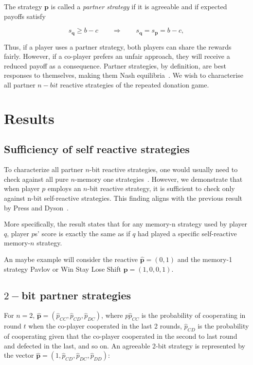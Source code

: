 \documentclass{article}
\theoremstyle{definition}
\begin{document}
The strategy $\mathbf{p}$ is called a {\it partner strategy} if it is agreeable
and if expected payoffs satisfy

\begin{equation} \label{Eq:partner}
    s_{\mathbf{q}} \geq b\!-\!c \qquad \Rightarrow \qquad s_{\mathbf{q}} = s_{\mathbf{p}} =  b\!-\!c,
\end{equation}

Thus, if a player uses a partner strategy, both players can share the rewards
fairly. However, if a co-player prefers an unfair approach, they will receive a
reduced payoff as a consequence. Partner strategies, by definition, are best
responses to themselves, making them Nash equilibria~\cite{Hilbe:GEB:2015}. We
wish to characterise all partner $n-bit$ reactive strategies of the repeated
donation game.

\section{Results}

\subsection{Sufficiency of self reactive strategies}

To characterize all partner $n$-bit reactive strategies, one would usually
need to check against all pure $n$-memory one strategies~\cite{mcavoy:PRSA:2019}.
However, we demonstrate that when player $p$ employs an $n$-bit reactive strategy,
it is sufficient to check only against n-bit self-reactive strategies. This
finding aligns with the previous result by Press and Dyson~\cite{press:PNAS:2012}.

More specifically, the result states that for any memory-n strategy used by
player $q$, player $p$s' score is exactly the same as if $q$ had played a
specific self-reactive memory-$n$ strategy.

An maybe example will consider the reactive $\mathbf{\hat{p}} = (0, 1)$ and the
memory-1 strategy Pavlov or Win Stay Lose Shift $\mathbf{p} = (1, 0, 0, 1)$.

\subsection{$2-$bit partner strategies}

For $n=2$, $\mathbf{\hat{p}}=(\hat{p}_{CC}, \hat{p}_{CD}, \hat{p}_{DC})$, where
$p\hat{p}_{CC}$ is the probability of cooperating in round \(t\) when the
co-player cooperated in the last 2 rounds, $\hat{p}_{CD}$ is the probability of
cooperating given that the co-player cooperated in the second to last round and
defected in the last, and so on. An agreeable 2-bit strategy is represented by
the vector $\mathbf{\hat{p}}=(1, \hat{p}_{CD}, \hat{p}_{DC}, \hat{p}_{DD})$:
\end{document}
